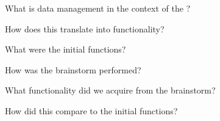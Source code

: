 What is data management in the context of the \ivfsystem{}?

How does this translate into functionality?

What were the initial functions?

How was the brainstorm performed?

What functionality did we acquire from the brainstorm?

How did this compare to the initial functions?